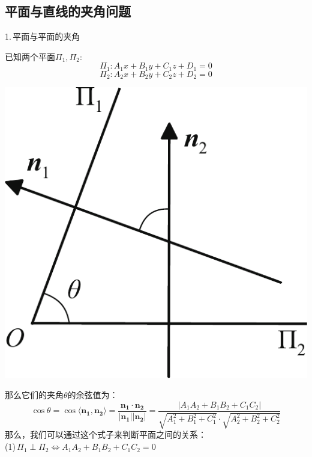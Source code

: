 \noindent
\begin{minipage}{0.6\linewidth}
\subsection{平面与直线的夹角问题}
1.$\,$平面与平面的夹角
\par 已知两个平面$\Pi_1,\Pi_2$:
\begin{equation}
	\nonumber
	\Pi_1:A_1x+B_1y+C_1z+D_1=0
\end{equation}
\begin{equation}
	\nonumber
	\Pi_2: A_2x+B_2y+C_2z+D_2=0
	\end{equation}
\end{minipage}
\begin{minipage}{0.4\linewidth}
	\centering
	\includegraphics[width = 0.65\linewidth]{pic/C-5/planeang}
	\vspace*{-1em}
	\label{平面与皮昂面的夹角}
\end{minipage}

\noindent 那么它们的夹角$\theta$的余弦值为：
\begin{equation}
	\cos \theta=\cos\langle \boldsymbol{n_1},\boldsymbol{n_2}\rangle =\frac{\boldsymbol{n_1}\cdot\boldsymbol{n_2}}{|\boldsymbol{n_1}||\boldsymbol{n_2}|}=\frac{|A_1A_2+B_1B_2+C_1C_2|}{\sqrt{A_1^2+B_1^2+C_1^2}\cdot\sqrt{A_2^2+B_2^2+C_2^2}}
\end{equation}
那么，我们可以通过这个式子来判断平面之间的关系：\\
(1)$\, \Pi_1\perp \Pi_2 \Leftrightarrow  A_1A_2+B_1B_2+C_1C_2=0$\\

